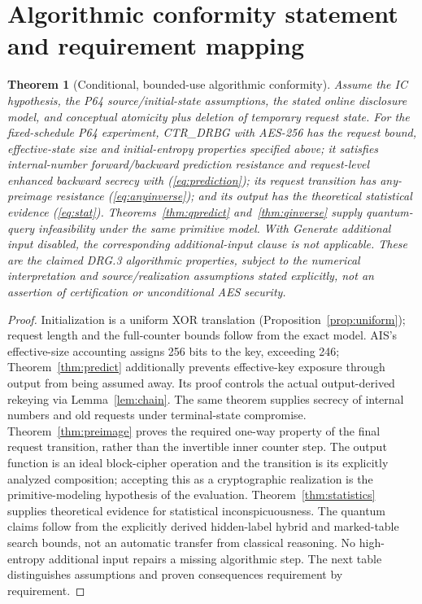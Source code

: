 \documentclass[11 pt,a 4 paper]{article}
\newtheorem{theorem}{Theorem}
\begin{document}
\section{Algorithmic conformity statement and requirement mapping}
\begin{theorem}[Conditional, bounded-use algorithmic conformity]\label{thm:conformity}
Assume the IC hypothesis, the P64 source/initial-state assumptions, the stated online disclosure model, and conceptual atomicity plus deletion of temporary request state. For the fixed-schedule P64 experiment, CTR\_DRBG with AES-256 has the request bound, effective-state size and initial-entropy properties specified above; it satisfies internal-number forward/backward prediction resistance and request-level enhanced backward secrecy with (\ref{eq:prediction}); its request transition has any-preimage resistance (\ref{eq:anyinverse}); and its output has the theoretical statistical evidence (\ref{eq:stat}). Theorems~\ref{thm:qpredict} and~\ref{thm:qinverse} supply quantum-query infeasibility under the same primitive model. With Generate additional input disabled, the corresponding additional-input clause is not applicable. These are the claimed DRG.3 algorithmic properties, subject to the numerical interpretation and source/realization assumptions stated explicitly, not an assertion of certification or unconditional AES security.
\end{theorem}
\begin{proof}
Initialization is a uniform XOR translation (Proposition~\ref{prop:uniform}); request length and the full-counter bounds follow from the exact model. AIS's effective-size accounting assigns 256 bits to the key, exceeding 246; Theorem~\ref{thm:predict} additionally prevents effective-key exposure through output from being assumed away. Its proof controls the actual output-derived rekeying via Lemma~\ref{lem:chain}. The same theorem supplies secrecy of internal numbers and old requests under terminal-state compromise. Theorem~\ref{thm:preimage} proves the required one-way property of the final request transition, rather than the invertible inner counter step. The output function is an ideal block-cipher operation and the transition is its explicitly analyzed composition; accepting this as a cryptographic realization is the primitive-modeling hypothesis of the evaluation. Theorem~\ref{thm:statistics} supplies theoretical evidence for statistical inconspicuousness. The quantum claims follow from the explicitly derived hidden-label hybrid and marked-table search bounds, not an automatic transfer from classical reasoning. No high-entropy additional input repairs a missing algorithmic step. The next table distinguishes assumptions and proven consequences requirement by requirement.
\end{proof}
\end{document}
